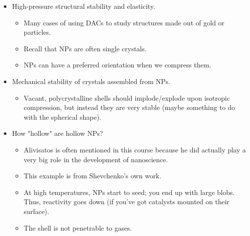 \documentclass[../notes.tex]{subfiles}
\begin{document}
\begin{itemize}
\begin{itemize}
        \item Compress a ruby and  up to \SI{50}{\giga\pascal}.
        \item Can you bring NPs close enough together to observe collective properties? At close enough distances, the organic strings around them intercalate. Can you push them even closer?
        \item The computer simulations of this took much longer than the actual DAC experiment.
        \item Removing pressure allows elastic recovery.
        \item Conclusions: In this case, we could not bring particles close enough together to observe collected properties. Not conclusive though; maybe other ligands, more pressure would work.
    \end{itemize}
    \item High-pressure structural stability and elasticity.
    \begin{itemize}
        \item Many cases of using DACs to study structures made out of gold or  particles.
        \item Recall that NPs are often single crystals.
        \item NPs can have a preferred orientation when we compress them.
    \end{itemize}
    \item Mechanical stability of crystals assembled from  NPs.
    \begin{itemize}
        \item Vacant, polycrystalline shells should implode/explode upon isotropic compression, but instead they are very stable (maybe something to do with the spherical shape).
    \end{itemize}
    \item How "hollow" are hollow  NPs?
    \begin{itemize}
        \item Alivisatos is often mentioned in this course because he did actually play a very big role in the development of nanoscience.
        \item This example is from Shevchenko's own work.
        \item At high temperatures, NPs start to seed; you end up with large blobs. Thus, reactivity goes down (if you've got catalysts mounted on their surface).
        \item The shell is not penetrable to gases.

\end{itemize}
\end{itemize}
\end{document}
